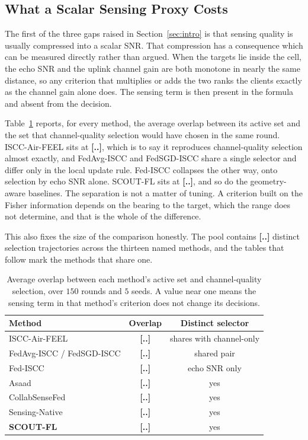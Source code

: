 \documentclass[lettersize,journal]{IEEEtran}
\newcommand{\scout}{SCOUT-FL}
\newcommand{\TBD}[1]{\textbf{[#1]}}
\begin{document}
\subsection{What a Scalar Sensing Proxy Costs}\label{sec:collapse}
The first of the three gaps raised in Section~\ref{sec:intro} is that sensing quality is usually compressed into a scalar SNR. That compression has a consequence which can be measured directly rather than argued. When the targets lie inside the cell, the echo SNR and the uplink channel gain are both monotone in nearly the same distance, so any criterion that multiplies or adds the two ranks the clients exactly as the channel gain alone does. The sensing term is then present in the formula and absent from the decision.

Table~\ref{tab:overlap} reports, for every method, the average overlap between its active set and the set that channel-quality selection would have chosen in the same round. ISCC-Air-FEEL sits at \TBD{..}, which is to say it reproduces channel-quality selection almost exactly, and FedAvg-ISCC and FedSGD-ISCC share a single selector and differ only in the local update rule. Fed-ISCC collapses the other way, onto selection by echo SNR alone. \scout{} sits at \TBD{..}, and so do the geometry-aware baselines. The separation is not a matter of tuning. A criterion built on the Fisher information depends on the bearing to the target, which the range does not determine, and that is the whole of the difference.

This also fixes the size of the comparison honestly. The pool contains \TBD{..} distinct selection trajectories across the thirteen named methods, and the tables that follow mark the methods that share one.

\begin{table}[!t]
\centering
\caption{Average overlap between each method's active set and channel-quality selection, over $150$ rounds and $5$ seeds. A value near one means the sensing term in that method's criterion does not change its decisions.}
\label{tab:overlap}
\renewcommand{\arraystretch}{1.2}
\setlength{\tabcolsep}{4pt}
\begin{tabular}{@{}lcc@{}}
\toprule
Method & Overlap & Distinct selector \\
\midrule
ISCC-Air-FEEL~\cite{wen2025isccairfeel} & \TBD{..} & shares with channel-only \\
FedAvg-ISCC / FedSGD-ISCC & \TBD{..} & shared pair \\
Fed-ISCC~\cite{du2024fediscc} & \TBD{..} & echo SNR only \\
Asaad~\cite{asaad2025} & \TBD{..} & yes \\
CollabSenseFed & \TBD{..} & yes \\
Sensing-Native & \TBD{..} & yes \\
\textbf{\scout{}} & \TBD{..} & yes \\
\bottomrule
\end{tabular}
\end{table}
\end{document}
